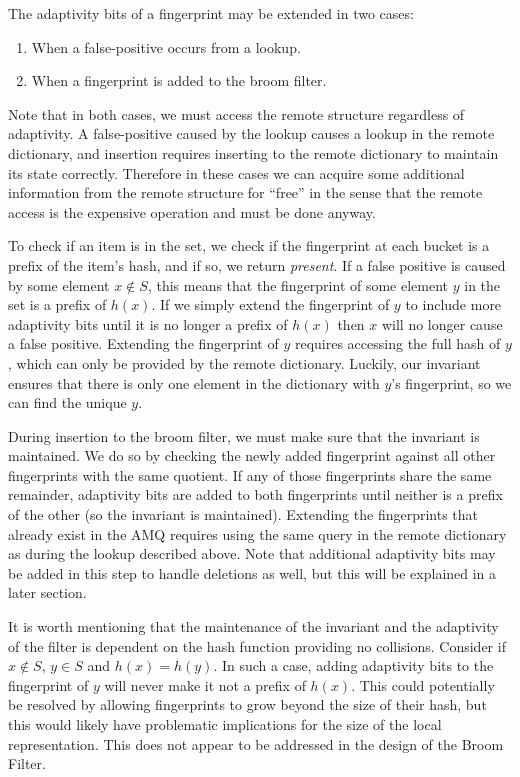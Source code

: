 \documentclass[../paper.tex]{subfiles}
\begin{document}
The adaptivity bits of a fingerprint may be extended in two cases:

\begin{enumerate}
    \item When a false-positive occurs from a lookup.
    \item When a fingerprint is added to the broom filter.
\end{enumerate}

Note that in both cases, we must access the remote structure regardless of adaptivity. A false-positive
caused by the lookup causes a lookup in the remote dictionary, and insertion requires inserting
to the remote dictionary to maintain its state correctly. Therefore in these cases we can
acquire some additional information from the remote structure for ``free'' in the sense that
the remote access is the expensive operation and must be done anyway.

To check if an item is in the set, we check if the fingerprint at each bucket is a prefix
of the item's hash, and if so, we return \textit{present}. 
If a false positive is caused by some element $x \notin S$, this means that
the fingerprint of some element $y$ in the set is a prefix of $h(x)$. If we
simply extend the fingerprint of $y$ to include more adaptivity bits until
it is no longer a prefix of $h(x)$ then $x$ will no longer cause a false positive. Extending
the fingerprint of $y$ requires accessing the full hash of $y$, which can only be
provided by the remote dictionary. Luckily, our invariant ensures that there is
only one element in the dictionary with $y$'s fingerprint, so we can find the unique
$y$.

During insertion to the broom filter, we must make sure that the invariant is maintained.
We do so by checking the newly added fingerprint against all other fingerprints with
the same quotient. If any of those fingerprints share the same remainder, adaptivity bits are
added to both fingerprints until neither is a prefix of the other (so the invariant
is maintained). Extending the fingerprints that already exist in the AMQ requires using
the same query in the remote dictionary as during the lookup described above. Note that additional
adaptivity bits may be added in this step to handle deletions as well, but this will be
explained in a later section.

It is worth mentioning that the maintenance of the
invariant and the adaptivity of the filter is dependent on the hash
function providing no collisions.  Consider if $x \notin S$, $y \in S$ and  $h(x)
= h(y)$.  In such a case, adding adaptivity bits to the fingerprint of $y$
will never make it not a prefix of $h(x)$.  This could potentially be
resolved by allowing fingerprints to grow beyond the size of their hash,
but this would likely have problematic implications for the size of the
local representation.  This does not appear to be addressed in the design
of the Broom Filter.  
\end{document}
